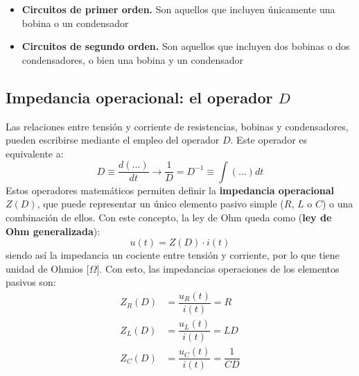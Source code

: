	\begin{itemize}
	    \item \textbf{Circuitos de primer orden.} Son aquellos que incluyen únicamente una bobina o un condensador
	    \item \textbf{Circuitos de segundo orden.} Son aquellos que incluyen dos bobinas o dos condensadores, o bien una bobina y  un condensador
	\end{itemize}

		
	\subsection{Impedancia operacional: el operador $D$ }\label{sec.operador_D}
	Las relaciones entre tensión y corriente de resistencias, bobinas y condensadores, pueden escribirse mediante el empleo del operador $D$. Este operador es equivalente a:
	\begin{equation*}
		D\equiv \dfrac{d(...)}{dt} \rightarrow \dfrac{1}{D}=D^{-1}\equiv \int (...) dt
	\end{equation*}
	Estos operadores matemáticos permiten definir la \textbf{impedancia operacional} $Z(D)$, que puede representar un único elemento pasivo simple ($R$, $L$ o $C$) o una combinación de ellos. Con este concepto, la ley de Ohm queda como (\textbf{ley de Ohm generalizada}):
	\begin{equation*}
		u(t)=Z(D)\cdot i(t)
	\end{equation*}
	siendo así la impedancia un cociente entre tensión y corriente, por lo que tiene unidad de Ohmios [$\Omega$].  Con esto, las impedancias operaciones de los elementos pasivos son: 
	\begin{align*}
		Z_R(D)&=\dfrac{u_R(t)}{i(t)}=R\\
		Z_L(D)&=\dfrac{u_L(t)}{i(t)}=LD\\
		Z_C(D)&=\dfrac{u_C(t)}{i(t)}=\dfrac{1}{CD}
	\end{align*}
	
